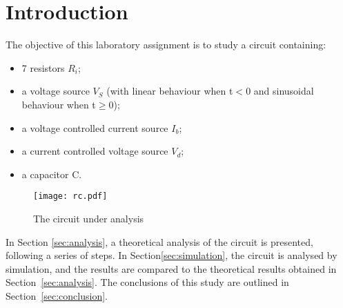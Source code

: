 \section{Introduction}
\label{sec:introduction}

The objective of this laboratory assignment is to study a circuit containing:
\begin{itemize}
 \item 7 resistors $R_i$;
 \item a voltage source $V_S$ (with linear behaviour when t$<$0 and sinusoidal behaviour when t$\geq$0);
 \item a voltage controlled current source $I_b$;
 \item a current controlled voltage source $V_d$;
 \item a capacitor C.
\end{itemize}

\begin{figure}[h] \centering
\texttt{[image: rc.pdf]}
\caption{The circuit under analysis}
\label{fig:rc}
\end{figure}\label{fig:rc}

In Section \ref{sec:analysis}, a theoretical analysis of the circuit is
presented, following a series of steps. In Section\ref{sec:simulation}, the circuit is analysed by
simulation, and the results are compared to the theoretical results obtained in
Section~\ref{sec:analysis}. The conclusions of this study are outlined in
Section~\ref{sec:conclusion}.





